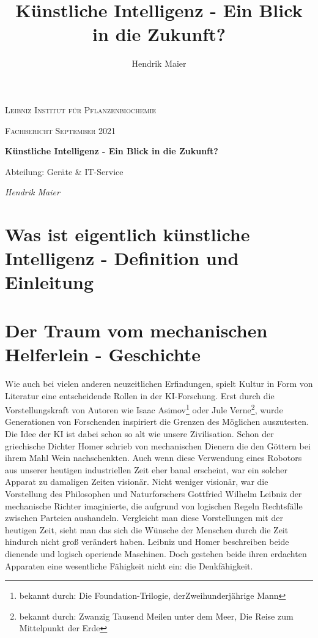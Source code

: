 \documentclass[12pt,german,ngerman]{report}
\title{Künstliche Intelligenz - Ein Blick in die Zukunft?}
\author{Hendrik Maier}
\date{}
\begin{document}
    \begin{titlepage}
        \centering
        {\scshape\LARGE Leibniz Institut für Pflanzenbiochemie\par}
        \vspace{1cm}
        {\scshape\Large Fachbericht September 2021\par}
        \vspace{1.5cm}
        {\huge\bfseries Künstliche Intelligenz - Ein Blick in die Zukunft?\par}
        \vspace{2cm}
        {\Large Abteilung: Geräte \& IT-Service\par}
        \vspace{1.5cm}
        {\Large\itshape Hendrik Maier\par}
        \vfill

    \end{titlepage}

    \tableofcontents
    \newpage

\chapter{Was ist eigentlich künstliche Intelligenz - Definition und Einleitung}
    

\chapter{Der Traum vom mechanischen Helferlein - Geschichte}

Wie auch bei vielen anderen neuzeitlichen Erfindungen, spielt Kultur in Form von Literatur eine entscheidende Rollen
in der KI-Forschung. Erst durch die Vorstellungskraft von Autoren wie Isaac Asimov\footnote{bekannt durch: Die Foundation-Trilogie, derZweihunderjährige Mann}
oder Jule Verne\footnote{bekannt durch: Zwanzig Tausend Meilen unter dem Meer, Die Reise zum Mittelpunkt der Erde}, wurde Generationen
von Forschenden inspiriert die Grenzen des Möglichen auszutesten. Die Idee der KI ist dabei schon so alt wie unsere
Zivilisation. Schon der griechische Dichter Homer schrieb von mechanischen Dienern die den Göttern bei ihrem Mahl
Wein nachschenkten.\cite[53]{buchanan2005very} Auch wenn diese Verwendung eines Robotors aus unserer heutigen
industriellen Zeit eher banal erscheint, war ein solcher Apparat zu damaligen Zeiten visionär.
Nicht weniger visionär, war die Vorstellung des Philosophen und Naturforschers Gottfried Wilhelm Leibniz der mechanische
Richter imaginierte, die aufgrund von logischen Regeln Rechtsfälle zwischen Parteien aushandeln.\cite[53]{buchanan2005very}
Vergleicht man diese Vorstellungen mit der heutigen Zeit, sieht man das sich die Wünsche der Menschen durch die Zeit hindurch
nicht groß verändert haben. Leibniz und Homer beschreiben beide dienende und logisch operiende Maschinen.
Doch gestehen beide ihren erdachten Apparaten eine wesentliche Fähigkeit nicht ein: die Denkfähigkeit. \\
\end{document}
